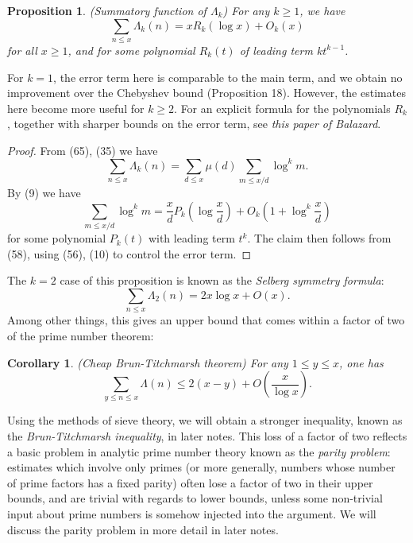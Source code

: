 \documentclass[10pt,reqno]{amsart}
\newtheorem{corollary}[theorem]{Corollary}
\newtheorem{prop}[theorem]{Proposition}
\begin{document}
\begin{prop} (Summatory function of $\Lambda_k$) For any $k \geq 1$, we have
    \[  \sum_{n \leq x} \Lambda_k(n) = x R_k( \log x ) + O_k(x) \]
    for all $x \geq 1$, and for some polynomial $R_k(t)$ of leading term $k t^{k-1}$.
\end{prop}

For $k=1$, the error term here is comparable to the main term, and we obtain no improvement over the Chebyshev bound (Proposition 18). However, the estimates here become more useful for $k \geq 2$. For an explicit formula for the polynomials $R_k$, together with sharper bounds on the error term, see \emph{this paper of Balazard}.

\begin{proof}
    From (65), (35) we have
    \[  \sum_{n \leq x} \Lambda_k(n) = \sum_{d \leq x} \mu(d) \sum_{m \leq x/d} \log^k m.\]
    By (9) we have
    \[ \sum_{m \leq x/d} \log^k m = \frac{x}{d} P_k \left(\log \frac{x}{d} \right) + O_k( 1 + \log^k \frac{x}{d} )\]
    for some polynomial $P_k(t)$ with leading term $t^k$. The claim then follows from (58), using (56), (10) to control the error term. %
\end{proof}

The $k=2$ case of this proposition is known as the \emph{Selberg symmetry formula}:
%
\begin{equation}   \sum_{n \leq x} \Lambda_2(n) = 2x \log x + O(x). \end{equation}
%
Among other things, this gives an upper bound that comes within a factor of two of the prime number theorem:

\begin{corollary}
    (Cheap Brun-Titchmarsh theorem) For any $1 \leq y \leq x$, one has
    \[  \sum_{y \leq n \leq x} \Lambda(n) \leq 2(x - y) + O \left( \frac{x}{\log x} \right).\]
\end{corollary}

Using the methods of sieve theory, we will obtain a stronger inequality, known as the \emph{Brun-Titchmarsh inequality}, in later notes. This loss of a factor of two reflects a basic problem in analytic prime number theory known as the \emph{parity problem}: estimates which involve only primes (or more generally, numbers whose number of prime factors has a fixed parity) often lose a factor of two in their upper bounds, and are trivial with regards to lower bounds, unless some non-trivial input about prime numbers is somehow injected into the argument. We will discuss the parity problem in more detail in later notes.
\end{document}
